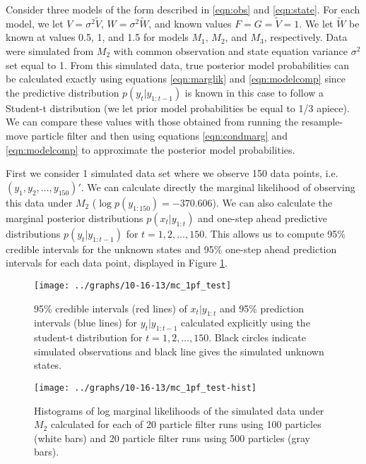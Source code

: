 \documentclass{article}
\begin{document}
Consider three models of the form described in \eqref{eqn:obs} and \eqref{eqn:state}. For each model, we let $V = \sigma^2\tilde{V}$, $W = \sigma^2\tilde{W}$, and known values $F = G = \tilde{V} = 1$. We let $\tilde{W}$ be known at values 0.5, 1, and 1.5 for models $M_1$, $M_2$, and $M_3$, respectively. Data were simulated from $M_2$ with common observation and state equation variance $\sigma^2$ set equal to 1. From this simulated data, true posterior model probabilities can be calculated exactly using equations \eqref{eqn:marglik} and \eqref{eqn:modelcomp} since the predictive distribution $p(y_t|y_{1:t-1})$ is known in this case to follow a Student-t distribution (we let prior model probabilities be equal to 1/3 apiece). We can compare these values with those obtained from running the resample-move particle filter and then using equations \eqref{eqn:condmarg} and \eqref{eqn:modelcomp} to approximate the posterior model probabilities.

First we consider 1 simulated data set where we observe 150 data points, i.e. $(y_1,y_2,\ldots,y_{150})'$. We can calculate directly the marginal likelihood of observing this data under $M_2$ ($\log p(y_{1:150}) = -370.606$). We can also calculate the marginal posterior distributions $p(x_t|y_{1:t})$ and one-step ahead predictive distributions $p(y_t|y_{1:t-1})$ for $t = 1,2,\ldots,150$. This allows us to compute 95\% credible intervals for the unknown states and 95\% one-step ahead prediction intervals for each data point, displayed in Figure \ref{fig:sim}.

\begin{figure}
\texttt{[image: ../graphs/10-16-13/mc\_1pf\_test]}
\caption{95\% credible intervals (red lines) of $x_t|y_{1:t}$ and 95\% prediction intervals (blue lines) for $y_t|y_{1:t-1}$ calculated explicitly using the student-t distribution for $t = 1,2,\ldots,150$. Black circles indicate simulated observations and black line gives the simulated unknown states.} \label{fig:sim}
\end{figure}

\begin{figure}
\texttt{[image: ../graphs/10-16-13/mc\_1pf\_test-hist]}
\caption{Histograms of log marginal likelihoods of the simulated data under $M_2$ calculated for each of 20 particle filter runs using 100 particles (white bars) and 20 particle filter runs using 500 particles (gray bars).} \label{fig:pfs}
\end{figure}
\end{document}
